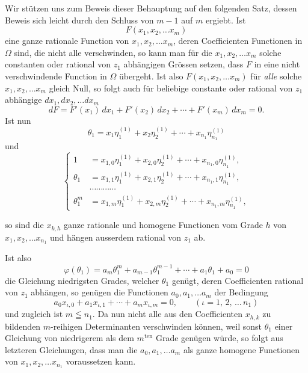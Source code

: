 \documentclass{article}
\begin{document}
Wir stützen uns zum Beweis dieser Behauptung auf den folgenden Satz, dessen Beweis sich leicht durch den Schluss von $m-1$ auf $m$ ergiebt. Ist
\[ F(x_{1}, x_{2}, \ldots x_{m}) \]
eine ganze rationale Function von $x_{1}, x_{2}, \ldots x_{m}$, deren Coefficienten Functionen in $\Omega$ sind, die nicht alle verschwinden, so kann man für die $x_{1}, x_{2}, \ldots x_{m}$ solche constanten oder rational von $z_{1}$ abhängigen Grössen setzen, dass $F$ in eine nicht verschwindende Function in $\Omega$ übergeht. Ist also $F(x_{1}, x_{2}, \ldots x_{m})$ für \emph{alle} solche $x_{1}, x_{2}, \ldots x_{m}$ gleich Null, so folgt auch für beliebige constante oder rational von $z_{1}$ abhängige $dx_{1}, dx_{2}, \ldots dx_{m}$
\[ dF = F'(x_{1})\,dx_{1} + F'(x_{2})\,dx_{2} + \cdots + F'(x_{m})\,dx_{m} = 0. \]
Ist nun
\[ \theta_{1} = x_{1}\eta_{1}^{(1)} + x_{2}\eta_{2}^{(1)} + \cdots + x_{n_{1}}\eta_{n_{1}}^{(1)} \]
und
\[ \left\{ \begin{aligned} 1 &= x_{1,0}\eta_{1}^{(1)} + x_{2,0}\eta_{2}^{(1)} + \cdots + x_{n_{1},0}\eta_{n_{1}}^{(1)}, \\ \theta_{1} &= x_{1,1}\eta_{1}^{(1)} + x_{2,1}\eta_{2}^{(1)} + \cdots + x_{n_{1},1}\eta_{n_{1}}^{(1)}, \\ &\cdots\cdots\cdots\cdots \\ \theta_{1}^{m} &= x_{1,m}\eta_{1}^{(1)} + x_{2,m}\eta_{2}^{(1)} + \cdots + x_{n_{1},m}\eta_{n_{1}}^{(1)}, \end{aligned} \right. \tag{5.} \]

so sind die $x_{k,h}$ ganze rationale und homogene Functionen vom Grade $h$ von $x_{1}, x_{2}, \ldots x_{n_{1}}$ und hängen ausserdem rational von $z_{1}$ ab.

Ist also
\[ \varphi(\theta_{1}) = a_{m}\theta_{1}^{m} + a_{m-1}\theta_{1}^{m-1} + \cdots + a_{1}\theta_{1} + a_{0} = 0 \]
die Gleichung niedrigsten Grades, welcher $\theta_{1}$ genügt, deren Coefficienten rational von $z_{1}$ abhängen, so genügen die Functionen $a_{0}, a_{1}, \ldots a_{m}$ der Bedingung
\[ a_{0}x_{\iota,0} + a_{1}x_{\iota,1} + \cdots + a_{m}x_{\iota,m} = 0, \qquad {\scriptstyle (\iota = 1,\, 2,\, \ldots\, n_{1})} \]
und zugleich ist $m \leqq n_{1}$. Da nun nicht alle aus den Coefficienten $x_{h,k}$ zu bildenden $m$-reihigen Determinanten verschwinden können, weil sonst $\theta_{1}$ einer Gleichung von niedrigerem als dem $m^{\text{ten}}$ Grade genügen würde, so folgt aus letzteren Gleichungen, dass man die $a_{0}, a_{1}, \ldots a_{m}$ als ganze homogene Functionen von $x_{1}, x_{2}, \ldots x_{n_{1}}$ voraussetzen kann.
\end{document}
